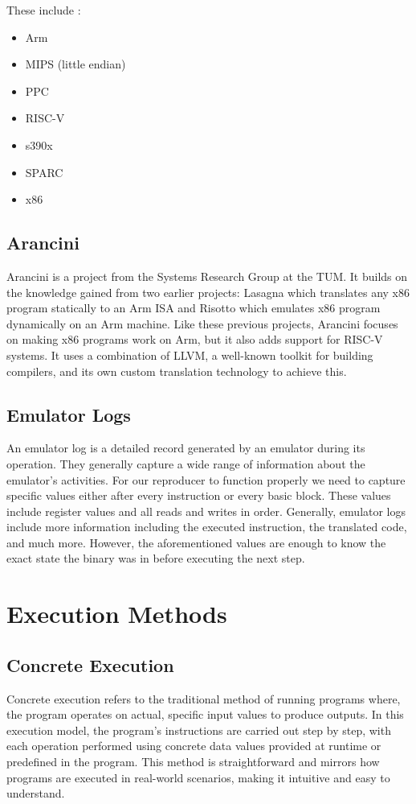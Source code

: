 These include \cite{qemu_arch}:
\begin{itemize}
    \item Arm
    \item MIPS (little endian)
    \item PPC
    \item RISC-V
    \item s390x
    \item SPARC
    \item x86
\end{itemize}

\subsection{Arancini}
Arancini is a project from the Systems Research Group at the \ac{TUM}.
It builds on the knowledge gained from two earlier projects: Lasagna \cite{rocha2022lasagne} which translates any x86 program statically to an Arm \ac{ISA} and Risotto \cite{gouicem2022risotto} which emulates x86 program dynamically on an Arm machine.
Like these previous projects, Arancini focuses on making x86 programs work on Arm, but it also adds support for RISC-V systems.
It uses a combination of LLVM, a well-known toolkit for building compilers, and its own custom translation technology to achieve this.

\subsection{Emulator Logs}
An emulator log is a detailed record generated by an emulator during its operation.
They generally capture a wide range of information about the emulator's activities.
For our reproducer to function properly we need to capture specific values either after every instruction or every basic block.
These values include register values and all reads and writes in order.
Generally, emulator logs include more information including the executed instruction, the translated code, and much more.
However, the aforementioned values are enough to know the exact state the binary was in before executing the next step.

\section{Execution Methods}
\subsection{Concrete Execution}
Concrete execution refers to the traditional method of running programs where, the program operates on actual, specific input values to produce outputs.
In this execution model, the program's instructions are carried out step by step, with each operation performed using concrete data values provided at runtime or predefined in the program. 
This method is straightforward and mirrors how programs are executed in real-world scenarios, making it intuitive and easy to understand. 

